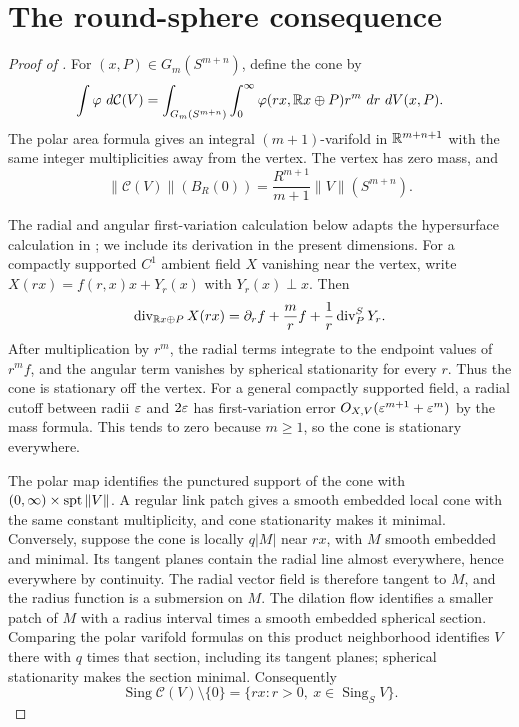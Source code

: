 \section{The round-sphere consequence}\label{sec:spheres}

\begin{proof}[Proof of ]
For $(x,P)\in G_m(S^{m+n})$, define the cone by
\[
 \int\varphi\,\mathop{}\!d\mathcal C(V)
 =\int_{G_m(S^{m+n})}\int_0^\infty
   \varphi(rx,\mathbb R x\oplus P)r^m\,\mathop{}\!d r\,\mathop{}\!d V(x,P).
\]
The polar area formula \cite[Chapter~3, \S2, (2.4)--(2.6)]{Simon2018} gives
an integral $(m+1)$-varifold in $\mathbb R^{m+n+1}$ with the same integer
multiplicities away from the vertex. The vertex has zero mass, and
\[
 \|\mathcal C(V)\|(B_R(0))
 =\frac{R^{m+1}}{m+1}\|V\|(S^{m+n}).
\]

The radial and angular first-variation calculation below adapts the
hypersurface calculation in \cite[Lemma~6.1]{OpenAISolomonYau2026};
we include its derivation in the present dimensions.
For a compactly supported $C^1$ ambient field $X$ vanishing near the vertex,
write $X(rx)=f(r,x)x+Y_r(x)$ with $Y_r(x)\perp x$. Then
\[
 \operatorname{div}_{\mathbb R x\oplus P}X(rx)
 =\partial_r f+\frac mr f+\frac1r\operatorname{div}^S_PY_r.
\]
After multiplication by $r^m$, the radial terms integrate to the endpoint
values of $r^mf$, and the angular term vanishes by spherical stationarity
for every $r$. Thus the cone is stationary off the vertex. For a general
compactly supported field, a radial cutoff between radii $\varepsilon$ and $2\varepsilon$
has first-variation error $O_{X,V}(\varepsilon^{m+1}+\varepsilon^m)$ by the mass formula.
This tends to zero because $m\geq1$, so the cone is stationary everywhere.

The polar map identifies the punctured support of the cone with
$(0,\infty)\times\operatorname{spt}\|V\|$. A regular link patch gives a smooth embedded
local cone with the same constant multiplicity, and cone stationarity makes
it minimal. Conversely, suppose the cone is locally $q|M|$ near $rx$, with
$M$ smooth embedded and minimal. Its tangent planes contain the radial line
almost everywhere, hence everywhere by continuity. The radial vector field
is therefore tangent to $M$, and the radius function is a submersion on $M$.
The dilation flow identifies a smaller patch of $M$ with a radius interval
times a smooth embedded spherical section. Comparing the polar varifold
formulas on this product neighborhood identifies $V$ there with $q$ times
that section, including its tangent planes; spherical stationarity makes the
section minimal. Consequently
\[
 \operatorname{Sing}\mathcal C(V)\setminus\{0\}
 =\{rx:r>0,\ x\in\operatorname{Sing}_S V\}.
\]


\end{proof}
